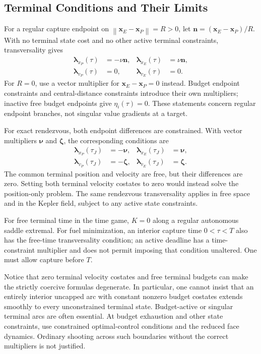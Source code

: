 \documentclass[journal,a4paper]{IEEEtran}
\newcommand{\norm}[1]{\left\|#1\right\|}
\begin{document}
\subsection{Terminal Conditions and Their Limits}
For a regular capture endpoint on $\norm{\mathbf x_E-\mathbf x_P}=R>0$, let $\mathbf n=(\mathbf x_E-\mathbf x_P)/R$. With no terminal state cost and no other active terminal constraints, transversality gives
\begin{align}
 \boldsymbol\lambda_{x_P}(\tau)&=-\nu\mathbf n,&
 \boldsymbol\lambda_{x_E}(\tau)&=\nu\mathbf n,\label{eq:transversality}\\
 \boldsymbol\lambda_{v_P}(\tau)&=0,&
 \boldsymbol\lambda_{v_E}(\tau)&=0.\nonumber
\end{align}
For $R=0$, use a vector multiplier for $\mathbf x_E-\mathbf x_P=0$ instead. Budget endpoint constraints and central-distance constraints introduce their own multipliers; inactive free budget endpoints give $\eta_i(\tau)=0$. These statements concern regular endpoint branches, not singular value gradients at a target.

For exact rendezvous, both endpoint differences are constrained. With vector multipliers $\boldsymbol\nu$ and $\boldsymbol\zeta$, the corresponding conditions are
\begin{align}
 \boldsymbol\lambda_{x_P}(\tau_J)&=-\boldsymbol\nu,&
 \boldsymbol\lambda_{x_E}(\tau_J)&=\boldsymbol\nu,\nonumber\\
 \boldsymbol\lambda_{v_P}(\tau_J)&=-\boldsymbol\zeta,&
 \boldsymbol\lambda_{v_E}(\tau_J)&=\boldsymbol\zeta.
 \label{eq:Jtransversality}
\end{align}
The common terminal position and velocity are free, but their differences are zero. Setting both terminal velocity costates to zero would instead solve the position-only problem. The same rendezvous transversality applies in free space and in the Kepler field, subject to any active state constraints.

For free terminal time in the time game, $K=0$ along a regular autonomous saddle extremal. For fuel minimization, an interior capture time $0<\tau<T$ also has the free-time transversality condition; an active deadline has a time-constraint multiplier and does not permit imposing that condition unaltered. One must allow capture before $T$.

Notice that zero terminal velocity costates and free terminal budgets can make the strictly coercive formulas degenerate. In particular, one cannot insist that an entirely interior uncapped arc with constant nonzero budget costates extends smoothly to every unconstrained terminal state. Budget-active or singular terminal arcs are often essential. At budget exhaustion and other state constraints, use constrained optimal-control conditions and the reduced face dynamics. Ordinary shooting across such boundaries without the correct multipliers is not justified.
\end{document}
